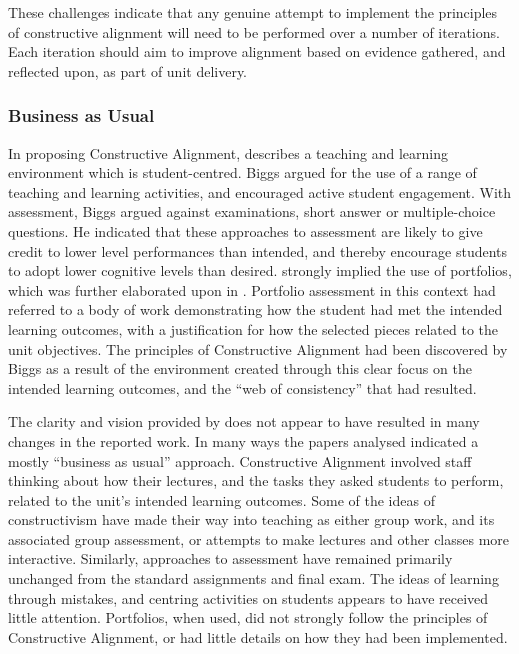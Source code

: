 These challenges indicate that any genuine attempt to implement the principles of constructive alignment will need to be performed over a number of iterations. Each iteration should aim to improve alignment based on evidence gathered, and reflected upon, as part of unit delivery.

 
\clearpage
\subsubsection{Business as Usual} %
\label{ssub:business_as_usual}

In proposing Constructive Alignment, \citet{Biggs:1996c} describes a teaching and learning environment which is student-centred. Biggs argued for the use of a range of teaching and learning activities, and encouraged active student engagement. With assessment, Biggs argued against examinations, short answer or multiple-choice questions. He indicated that these approaches to assessment are likely to give credit to lower level performances than intended, and thereby encourage students to adopt lower cognitive levels than desired. \citet{Biggs:1996c} strongly implied the use of portfolios, which was further elaborated upon in \citet{Biggs:1997}. Portfolio assessment in this context had referred to a body of work demonstrating how the student had met the intended learning outcomes, with a justification for how the selected pieces related to the unit objectives. The principles of Constructive Alignment had been discovered by Biggs as a result of the environment created through this clear focus on the intended learning outcomes, and the ``web of consistency'' that had resulted.

The clarity and vision provided by \citet{Biggs:1996c} does not appear to have resulted in many changes in the reported work. In many ways the papers analysed indicated a mostly ``business as usual'' approach. Constructive Alignment involved staff thinking about how their lectures, and the tasks they asked students to perform, related to the unit's intended learning outcomes. Some of the ideas of constructivism have made their way into teaching as either group work, and its associated group assessment, or attempts to make lectures and other classes more interactive. Similarly, approaches to assessment have remained primarily unchanged from the standard assignments and final exam. The ideas of learning through mistakes, and centring activities on students appears to have received little attention. Portfolios, when used, did not strongly follow the principles of Constructive Alignment, or had little details on how they had been implemented. 

